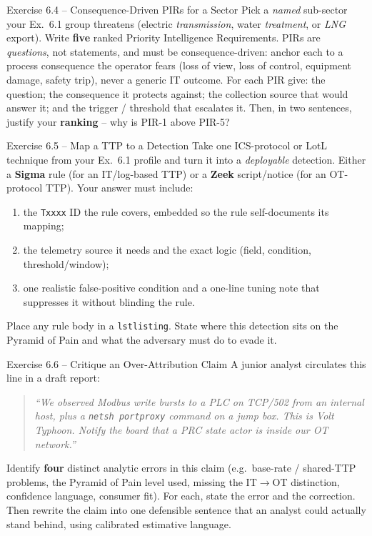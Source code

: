 \documentclass[11pt,a4paper]{article}
\begin{document}
\begin{taskbox}{Exercise 6.4 -- Consequence-Driven PIRs for a Sector}
Pick a \emph{named} sub-sector your Ex.~6.1 group threatens (electric \emph{transmission},
water \emph{treatment}, or \emph{LNG} export). Write \textbf{five} ranked Priority
Intelligence Requirements. PIRs are \emph{questions}, not statements, and must be
consequence-driven: anchor each to a process consequence the operator fears (loss of view,
loss of control, equipment damage, safety trip), never a generic IT outcome. For each PIR
give: the question; the consequence it protects against; the collection source that would
answer it; and the trigger / threshold that escalates it. Then, in two sentences, justify your
\textbf{ranking} -- why is PIR-1 above PIR-5?
\end{taskbox}

\begin{taskbox}{Exercise 6.5 -- Map a TTP to a Detection}
Take one ICS-protocol or LotL technique from your Ex.~6.1 profile and turn it into a
\emph{deployable} detection. Either a \textbf{Sigma} rule (for an IT/log-based TTP) or a
\textbf{Zeek} script/notice (for an OT-protocol TTP). Your answer must include:
\begin{enumerate}\setlength{\itemsep}{0pt}
  \item the \texttt{Txxxx} ID the rule covers, embedded so the rule self-documents its mapping;
  \item the telemetry source it needs and the exact logic (field, condition, threshold/window);
  \item one realistic false-positive condition and a one-line tuning note that suppresses it
        without blinding the rule.
\end{enumerate}
Place any rule body in a \texttt{lstlisting}. State where this detection sits on the Pyramid of
Pain and what the adversary must do to evade it.
\end{taskbox}

\begin{taskbox}{Exercise 6.6 -- Critique an Over-Attribution Claim}
A junior analyst circulates this line in a draft report:

\begin{quote}\itshape
``We observed Modbus write bursts to a PLC on TCP/502 from an internal host, plus a
\texttt{netsh portproxy} command on a jump box. This is Volt Typhoon. Notify the board that a
PRC state actor is inside our OT network.''
\end{quote}

Identify \textbf{four} distinct analytic errors in this claim (e.g.\ base-rate / shared-TTP
problems, the Pyramid of Pain level used, missing the IT$\to$OT distinction, confidence
language, consumer fit). For each, state the error and the correction. Then rewrite the claim
into one defensible sentence that an analyst could actually stand behind, using calibrated
estimative language.
\end{taskbox}
\end{document}
